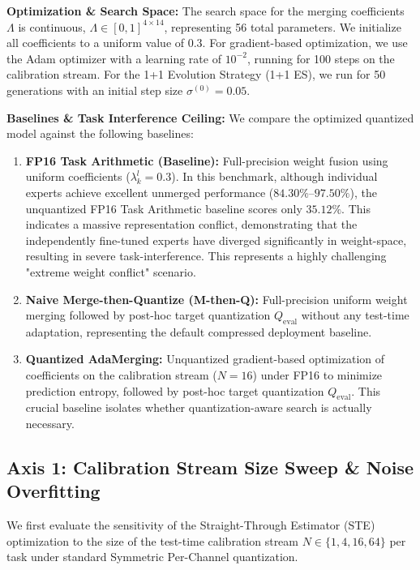 \textbf{Optimization \& Search Space:} The search space for the merging coefficients $\Lambda$ is continuous, $\Lambda \in [0, 1]^{4 \times 14}$, representing 56 total parameters. We initialize all coefficients to a uniform value of 0.3. For gradient-based optimization, we use the Adam optimizer \cite{kingma2014adam} with a learning rate of $10^{-2}$, running for 100 steps on the calibration stream. For the 1+1 Evolution Strategy (1+1 ES), we run for 50 generations with an initial step size $\sigma^{(0)} = 0.05$.

\textbf{Baselines \& Task Interference Ceiling:}
We compare the optimized quantized model against the following baselines:
\begin{enumerate}
    \item \textbf{FP16 Task Arithmetic (Baseline):} Full-precision weight fusion using uniform coefficients ($\lambda^l_k = 0.3$). In this benchmark, although individual experts achieve excellent unmerged performance ($84.30\%\text{--}97.50\%$), the unquantized FP16 Task Arithmetic baseline scores only $35.12\%$. This indicates a massive representation conflict, demonstrating that the independently fine-tuned experts have diverged significantly in weight-space, resulting in severe task-interference. This represents a highly challenging "extreme weight conflict" scenario.
    \item \textbf{Naive Merge-then-Quantize (M-then-Q):} Full-precision uniform weight merging followed by post-hoc target quantization $Q_{\text{eval}}$ without any test-time adaptation, representing the default compressed deployment baseline.
    \item \textbf{Quantized AdaMerging:} Unquantized gradient-based optimization of coefficients on the calibration stream ($N=16$) under FP16 to minimize prediction entropy, followed by post-hoc target quantization $Q_{\text{eval}}$. This crucial baseline isolates whether quantization-aware search is actually necessary.
\end{enumerate}

\subsection{Axis 1: Calibration Stream Size Sweep \& Noise Overfitting}
We first evaluate the sensitivity of the Straight-Through Estimator (STE) optimization to the size of the test-time calibration stream $N \in \{1, 4, 16, 64\}$ per task under standard Symmetric Per-Channel quantization. 

